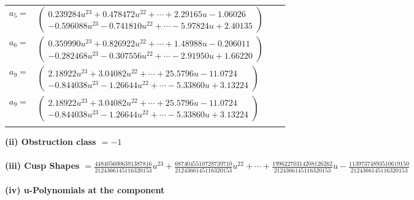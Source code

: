 \documentclass[1p]{elsarticle_modified}
\theoremstyle{definition}
\begin{document}
\begin{tabular}{m{7pt} m{180pt} m{7pt} m{180pt} }
\flushright $a_{5}=$&$\begin{pmatrix}0.239284 u^{23}+0.478472 u^{22}+\cdots+2.29165 u-1.06026\\-0.596088 u^{23}-0.741810 u^{22}+\cdots-5.97824 u+2.40135\end{pmatrix}$ \\
\flushright $a_{6}=$&$\begin{pmatrix}0.359990 u^{23}+0.826922 u^{22}+\cdots+1.48988 u-0.206011\\-0.282468 u^{23}-0.307556 u^{22}+\cdots-2.91950 u+1.66220\end{pmatrix}$ \\
\flushright $a_{9}=$&$\begin{pmatrix}2.18922 u^{23}+3.04082 u^{22}+\cdots+25.5796 u-11.0724\\-0.844038 u^{23}-1.26644 u^{22}+\cdots-5.33860 u+3.13224\end{pmatrix}$\\ \flushright $a_{9}=$&$\begin{pmatrix}2.18922 u^{23}+3.04082 u^{22}+\cdots+25.5796 u-11.0724\\-0.844038 u^{23}-1.26644 u^{22}+\cdots-5.33860 u+3.13224\end{pmatrix}$\\&\end{tabular}
\flushleft \textbf{(ii) Obstruction class $= -1$}\\~\\
\flushleft \textbf{(iii) Cusp Shapes $= \frac{4484056006391387816}{2124366145116320153} u^{23}+\frac{6874045510728739710}{2124366145116320153} u^{22}+\cdots+\frac{19962270314208126262}{2124366145116320153} u-\frac{11397374893510619150}{2124366145116320153}$}\\~\\
\newpage\renewcommand{\arraystretch}{1}
\flushleft \textbf{(iv) u-Polynomials at the component}\newline \\
\end{document}
